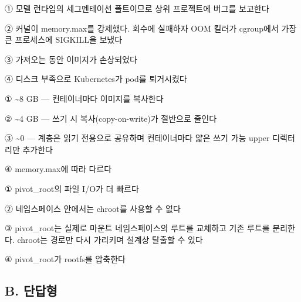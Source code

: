 \begin{tbboptions}
  \item ① 모델 런타임의 세그멘테이션 폴트이므로 상위 프로젝트에 버그를 보고한다
  \item ② 커널이 memory.max를 강제했다. 회수에 실패하자 OOM 킬러가 cgroup에서 가장 큰 프로세스에 SIGKILL을 보냈다
  \item ③ 가져오는 동안 이미지가 손상되었다
  \item ④ 디스크 부족으로 Kubernetes가 pod를 퇴거시켰다
\end{tbboptions}


\begin{tbboptions}
  \item ① \textasciitilde{}8 GB — 컨테이너마다 이미지를 복사한다
  \item ② \textasciitilde{}4 GB — 쓰기 시 복사(copy-on-write)가 절반으로 줄인다
  \item ③ \textasciitilde{}0 — 계층은 읽기 전용으로 공유하며 컨테이너마다 얇은 쓰기 가능 upper 디렉터리만 추가한다
  \item ④ memory.max에 따라 다르다
\end{tbboptions}


\begin{tbboptions}
  \item ① pivot\_root의 파일 I/O가 더 빠르다
  \item ② 네임스페이스 안에서는 chroot를 사용할 수 없다
  \item ③ pivot\_root는 실제로 마운트 네임스페이스의 루트를 교체하고 기존 루트를 분리한다. chroot는 경로만 다시 가리키며 설계상 탈출할 수 있다
  \item ④ pivot\_root가 rootfs를 압축한다
\end{tbboptions}

\subsection*{B. 단답형}



